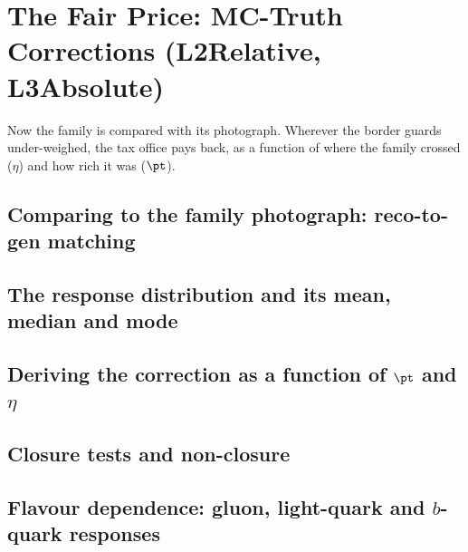 \chapter{The Fair Price: MC-Truth Corrections (L2Relative, L3Absolute)}
\label{ch:fair_price}

\begin{journeybox}
Now the family is compared with its photograph. Wherever the border guards
under-weighed, the tax office pays back, as a function of where the family
crossed ($\eta$) and how rich it was ($\pt$).
\end{journeybox}


\section{Comparing to the family photograph: reco-to-gen matching}
\label{sec:fair_price:comparing_to_the_family_photograph_reco_}

\section{The response distribution and its mean, median and mode}
\label{sec:fair_price:the_response_distribution_and_its_mean_m}

\section{Deriving the correction as a function of $\pt$ and $\eta$}
\label{sec:fair_price:deriving_the_correction_as_a_function_of}

\section{Closure tests and non-closure}
\label{sec:fair_price:closure_tests_and_non_closure}

\section{Flavour dependence: gluon, light-quark and $b$-quark responses}
\label{sec:fair_price:flavour_dependence_gluon_light_quark_and}

